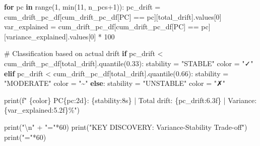 \documentclass[
  letterpaper,
  DIV=11,
  numbers=noendperiod]{scrartcl}
\newenvironment{Shaded}{\begin{snugshade}}{\end{snugshade}}
\newcommand{\BuiltInTok}[1]{\textcolor[rgb]{0.00,0.23,0.31}{#1}}
\newcommand{\CharTok}[1]{\textcolor[rgb]{0.13,0.47,0.30}{#1}}
\newcommand{\CommentTok}[1]{\textcolor[rgb]{0.37,0.37,0.37}{#1}}
\newcommand{\ControlFlowTok}[1]{\textcolor[rgb]{0.00,0.23,0.31}{\textbf{#1}}}
\newcommand{\DecValTok}[1]{\textcolor[rgb]{0.68,0.00,0.00}{#1}}
\newcommand{\FloatTok}[1]{\textcolor[rgb]{0.68,0.00,0.00}{#1}}
\newcommand{\KeywordTok}[1]{\textcolor[rgb]{0.00,0.23,0.31}{\textbf{#1}}}
\newcommand{\NormalTok}[1]{\textcolor[rgb]{0.00,0.23,0.31}{#1}}
\newcommand{\OperatorTok}[1]{\textcolor[rgb]{0.37,0.37,0.37}{#1}}
\newcommand{\SpecialCharTok}[1]{\textcolor[rgb]{0.37,0.37,0.37}{#1}}
\newcommand{\SpecialStringTok}[1]{\textcolor[rgb]{0.13,0.47,0.30}{#1}}
\newcommand{\StringTok}[1]{\textcolor[rgb]{0.13,0.47,0.30}{#1}}
\renewenvironment{Shaded}{%
  \begin{tcolorbox}[%
    enhanced,%
    colback=codebg,%
    colframe=codebg,%
    borderline west={3pt}{0pt}{sectionblue},%
    fontupper=\small\ttfamily,%
    boxrule=0pt,%
    arc=0pt,%
    boxsep=5pt,%
    left=2mm,%
    right=2mm,%
    top=2mm,%
    bottom=2mm%
  ]%
}{%
  \end{tcolorbox}%
}
\begin{document}
\begin{Shaded}
\begin{Highlighting}[]
\ControlFlowTok{for}\NormalTok{ pc }\KeywordTok{in} \BuiltInTok{range}\NormalTok{(}\DecValTok{1}\NormalTok{, }\BuiltInTok{min}\NormalTok{(}\DecValTok{11}\NormalTok{, n\_pcs}\OperatorTok{+}\DecValTok{1}\NormalTok{)):}
\NormalTok{    pc\_drift }\OperatorTok{=}\NormalTok{ cum\_drift\_pc\_df[cum\_drift\_pc\_df[}\StringTok{\textquotesingle{}PC\textquotesingle{}}\NormalTok{] }\OperatorTok{==}\NormalTok{ pc][}\StringTok{\textquotesingle{}total\_drift\textquotesingle{}}\NormalTok{].values[}\DecValTok{0}\NormalTok{]}
\NormalTok{    var\_explained }\OperatorTok{=}\NormalTok{ cum\_drift\_pc\_df[cum\_drift\_pc\_df[}\StringTok{\textquotesingle{}PC\textquotesingle{}}\NormalTok{] }\OperatorTok{==}\NormalTok{ pc][}\StringTok{\textquotesingle{}variance\_explained\textquotesingle{}}\NormalTok{].values[}\DecValTok{0}\NormalTok{] }\OperatorTok{*} \DecValTok{100}
    
    \CommentTok{\# Classification based on actual drift}
    \ControlFlowTok{if}\NormalTok{ pc\_drift }\OperatorTok{\textless{}}\NormalTok{ cum\_drift\_pc\_df[}\StringTok{\textquotesingle{}total\_drift\textquotesingle{}}\NormalTok{].quantile(}\FloatTok{0.33}\NormalTok{):}
\NormalTok{        stability }\OperatorTok{=} \StringTok{"STABLE"}
\NormalTok{        color }\OperatorTok{=} \StringTok{"✓"}
    \ControlFlowTok{elif}\NormalTok{ pc\_drift }\OperatorTok{\textless{}}\NormalTok{ cum\_drift\_pc\_df[}\StringTok{\textquotesingle{}total\_drift\textquotesingle{}}\NormalTok{].quantile(}\FloatTok{0.66}\NormalTok{):}
\NormalTok{        stability }\OperatorTok{=} \StringTok{"MODERATE"}
\NormalTok{        color }\OperatorTok{=} \StringTok{"\textasciitilde{}"}
    \ControlFlowTok{else}\NormalTok{:}
\NormalTok{        stability }\OperatorTok{=} \StringTok{"UNSTABLE"}
\NormalTok{        color }\OperatorTok{=} \StringTok{"✗"}
    
    \BuiltInTok{print}\NormalTok{(}\SpecialStringTok{f"  }\SpecialCharTok{\{}\NormalTok{color}\SpecialCharTok{\}}\SpecialStringTok{ PC}\SpecialCharTok{\{}\NormalTok{pc}\SpecialCharTok{:2d\}}\SpecialStringTok{: }\SpecialCharTok{\{}\NormalTok{stability}\SpecialCharTok{:8s\}}\SpecialStringTok{ | Total drift: }\SpecialCharTok{\{}\NormalTok{pc\_drift}\SpecialCharTok{:6.3f\}}\SpecialStringTok{ | Variance: }\SpecialCharTok{\{}\NormalTok{var\_explained}\SpecialCharTok{:5.2f\}}\SpecialStringTok{\%"}\NormalTok{)}

\BuiltInTok{print}\NormalTok{(}\StringTok{"}\CharTok{\textbackslash{}n}\StringTok{"} \OperatorTok{+} \StringTok{"="}\OperatorTok{*}\DecValTok{60}\NormalTok{)}
\BuiltInTok{print}\NormalTok{(}\StringTok{"KEY DISCOVERY: Variance{-}Stability Trade{-}off"}\NormalTok{)}
\BuiltInTok{print}\NormalTok{(}\StringTok{"="}\OperatorTok{*}\DecValTok{60}\NormalTok{)}


\end{Highlighting}
\end{Shaded}
\end{document}
